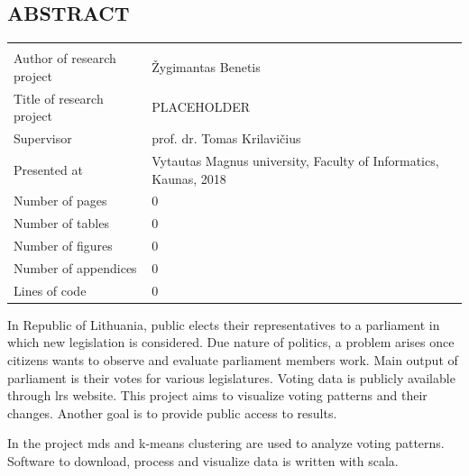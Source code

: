 \documentclass[a4paper,12pt]{article}
\begin{document}
   
    
    
    \begin{center}
        \section*{ABSTRACT}
    \end{center}
	
        
        
        \noindent
        \begin{center}
        	\begin{tabular}{L{4.5cm} L{8cm}}
        		\\ 
        		Author of research project & Žygimantas Benetis \\
        		Title of research project & PLACEHOLDER\\
        		Supervisor & prof. dr. Tomas Krilavičius\\
        		Presented at & Vytautas Magnus university, Faculty of Informatics, Kaunas, 2018\\
        		Number of pages & 0\\
        		Number of tables & 0\\
        		Number of figures & 0\\
        		Number of appendices & 0\\
        		Lines of code & 0\\
        	\end{tabular}
        \end{center} 
        
        \vspace{5mm}
        
        In Republic of Lithuania, public elects their representatives to a parliament in which new legislation is considered. Due nature of politics, a problem arises once citizens wants to observe and evaluate parliament members work. Main output of parliament is their votes for various legislatures. Voting data is publicly available through \gls{lrs} website. This project aims to visualize voting patterns and their changes. Another goal is to provide public access to results.
        
        In the project \gls{mds} and \gls{k-means} clustering are used to analyze voting patterns. Software to download, process and visualize  data is written with \gls{scala}.
        
\end{document}
